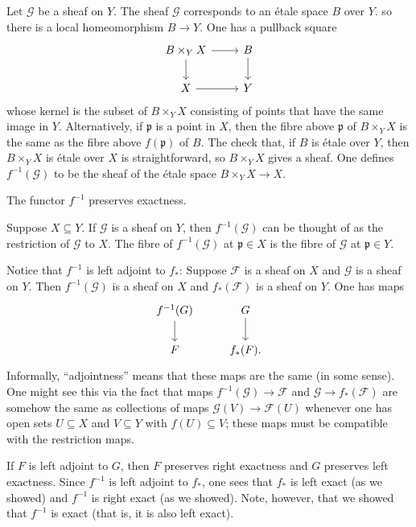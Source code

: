 \documentclass [11 pt, oneside] {article}
\begin{document}
Let $\mathscr{G}$ be a sheaf on $Y$. The sheaf $\mathscr{G}$ corresponds to an \'etale space $B$ over $Y$. so there is a local homeomorphism $B\longrightarrow Y$. One has a pullback square
\[
\begin{tikzcd}
	B\times_Y X \ar[r] \ar[d] & B\ar[d]\\
	X \ar[r] & Y
\end{tikzcd}
\]
whose kernel is the subset of $B\times_Y X$ consisting of points that have the same image in $Y$. Alternatively, if $\mathfrak p$ is a point in $X$, then the fibre above $\mathfrak p$ of $B\times_Y X$ is the same as the fibre above $f(\mathfrak p)$ of $B$. The check that, if $B$ is \'etale over $Y$, then $B\times_Y X$ is \'etale over $X$ is straightforward, so $B\times_Y X$ gives a sheaf. One defines $f^{-1}(\mathscr{G})$ to be the sheaf of the \'etale space $B\times_Y X\longrightarrow X$.

\begin{remark}
	The functor $f^{-1}$ preserves exactness.
\end{remark}

\begin{example}[ ]\label{}\text{}
Suppose $X\subseteq Y$. If $\mathscr{G}$ is a sheaf on $Y$, then $f^{-1}(\mathscr{G})$ can be thought of as the restriction of $\mathscr{G}$ to $X$. The fibre of $f^{-1}(\mathscr{G})$ at $\mathfrak p\in X$ is the fibre of $\mathscr{G}$ at $\mathfrak p\in Y$.
\end{example}

Notice that $f^{-1}$ is left adjoint to $f_*$: Suppose $\mathscr{F}$ is a sheaf on $X$ and $\mathscr{G}$ is a sheaf on $Y$. Then $f^{-1}(\mathscr{G})$ is a sheaf on $X$ and $f_*(\mathscr{F})$ is a sheaf on $Y$. One has maps
\[
\begin{tikzcd}
	f^{-1}(\mathscr{G}) \ar[d]& \mathscr{G}\ar[d]\\
	\mathscr{F} & f_*(\mathscr{F}).
\end{tikzcd}
\]
Informally, ``adjointness'' means that these maps are the same (in some sense). One might see this via the fact that maps $f^{-1}(\mathscr{G})\longrightarrow \mathscr{F}$ and $\mathscr{G}\longrightarrow f_*(\mathscr{F})$ are somehow the same as collections of maps $\mathscr{G}(V) \longrightarrow \mathscr{F}(U)$ whenever one has open sets $U\subseteq X$ and $V\subseteq Y$ with $f(U)\subseteq V$; these maps must be compatible with the restriction maps.

If $F$ is left adjoint to $G$, then $F$ preserves right exactness and $G$ preserves left exactness. Since $f^{-1}$ is left adjoint to $f_*$, one sees that $f_*$ is left exact (as we showed) and $f^{-1}$ is right exact (as we showed). Note, however, that we showed that $f^{-1}$ is exact (that is, it is also left exact).
\end{document}
